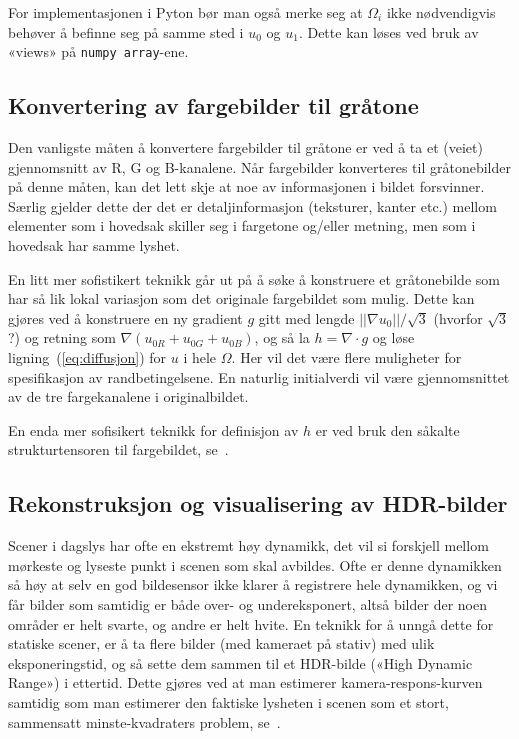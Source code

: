\documentclass[11pt,a4paper]{article}
\begin{document}
For implementasjonen i Pyton bør man også merke seg at $\Omega_i$ ikke
nødvendigvis behøver å befinne seg på samme sted i $u_0$ og $u_1$.
Dette kan løses ved bruk av «views» på \texttt{numpy array}-ene.

\subsection{Konvertering av fargebilder til gråtone}

Den vanligste måten å konvertere fargebilder til gråtone er ved å ta
et (veiet) gjennomsnitt av R, G og B-kanalene. Når fargebilder
konverteres til gråtonebilder på denne måten, kan det lett skje at noe
av informasjonen i bildet forsvinner. Særlig gjelder dette der det er
detaljinformasjon (teksturer, kanter etc.) mellom elementer som i
hovedsak skiller seg i fargetone og/eller metning, men som i hovedsak
har samme lyshet.

En litt mer sofistikert teknikk går ut på å søke å konstruere et
gråtonebilde som har så lik lokal variasjon som det originale
fargebildet som mulig. Dette kan gjøres ved å konstruere en ny
gradient $g$ gitt med lengde $||\nabla u_0||/\sqrt{3}$ (hvorfor
$\sqrt{3}$?) og retning som $\nabla(u_{0R} + u_{0G} + u_{0B})$, og så la
$h = \nabla\cdot g$ og løse ligning~(\ref{eq:diffusjon}) for $u$ i
hele $\Omega$. Her vil det være flere muligheter for spesifikasjon av
randbetingelsene. En naturlig initialverdi vil være gjennomsnittet av
de tre fargekanalene i originalbildet.

En enda mer sofisikert teknikk for definisjon av $h$ er ved bruk den
såkalte strukturtensoren til fargebildet, se~\cite{Alsam:08}.

\subsection{Rekonstruksjon og visualisering av HDR-bilder}

Scener i dagslys har ofte en ekstremt høy dynamikk, det vil si
forskjell mellom mørkeste og lyseste punkt i scenen som skal avbildes.
Ofte er denne dynamikken så høy at selv en god bildesensor ikke klarer
å registrere hele dynamikken, og vi får bilder som samtidig er både
over- og undereksponert, altså bilder der noen områder er helt svarte,
og andre er helt hvite. En teknikk for å unngå dette for statiske
scener, er å ta flere bilder (med kameraet på stativ) med ulik
eksponeringstid, og så sette dem sammen til et HDR-bilde («High
Dynamic Range») i ettertid. Dette gjøres ved at man estimerer
kamera-respons-kurven samtidig som man estimerer den faktiske lysheten
i scenen som et stort, sammensatt minste-kvadraters problem,
se~\cite{Debevec:97}.
\end{document}
